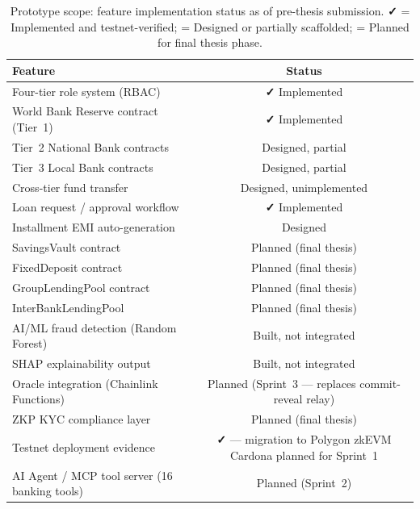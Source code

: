 \documentclass[12pt,a4paper]{report}
\newcommand{\tmarkDone}{\textbf{\faCheck}}
\newcommand{\tmarkPartial}{\faHourglassHalf}
\newcommand{\tmarkPlanned}{\textcolor{black!55}{\faCircle}}
\newcommand{\tableheadcolor}{\rowcolor{black!8}}
\newcommand{\tableheadfont}{\bfseries\small}
\begin{document}
\begin{table}[H]
\centering
\caption{Prototype scope: feature implementation status as of pre-thesis submission. \tmarkDone{} = Implemented and testnet-verified; \tmarkPartial{} = Designed or partially scaffolded; \tmarkPlanned{} = Planned for final thesis phase.}
\label{tab:prototype-scope}
\renewcommand{\arraystretch}{1.3}
\small
\begin{tabular}{@{}p{7.5cm}c@{}}
\toprule
\tableheadcolor
\tableheadfont Feature & \tableheadfont Status \\
\midrule
Four-tier role system (RBAC) & \tmarkDone{} Implemented \\
\rowcolor{RowShade}
World Bank Reserve contract (Tier~1) & \tmarkDone{} Implemented \\
Tier~2 National Bank contracts & \tmarkPartial{} Designed, partial \\
\rowcolor{RowShade}
Tier~3 Local Bank contracts & \tmarkPartial{} Designed, partial \\
Cross-tier fund transfer & \tmarkPartial{} Designed, unimplemented \\
\rowcolor{RowShade}
Loan request / approval workflow & \tmarkDone{} Implemented \\
Installment EMI auto-generation & \tmarkPartial{} Designed \\
\rowcolor{RowShade}
SavingsVault contract & \tmarkPlanned{} Planned (final thesis) \\
FixedDeposit contract & \tmarkPlanned{} Planned (final thesis) \\
\rowcolor{RowShade}
GroupLendingPool contract & \tmarkPlanned{} Planned (final thesis) \\
InterBankLendingPool & \tmarkPlanned{} Planned (final thesis) \\
\rowcolor{RowShade}
AI/ML fraud detection (Random Forest) & \tmarkPartial{} Built, not integrated \\
SHAP explainability output & \tmarkPartial{} Built, not integrated \\
\rowcolor{RowShade}
Oracle integration (Chainlink Functions) & \tmarkPlanned{} Planned (Sprint~3 --- replaces commit-reveal relay) \\
ZKP KYC compliance layer & \tmarkPlanned{} Planned (final thesis) \\
\rowcolor{RowShade}
Testnet deployment evidence & \tmarkDone{} --- migration to Polygon zkEVM Cardona planned for Sprint~1 \\
AI Agent / MCP tool server (16 banking tools) & \tmarkPlanned{} Planned (Sprint~2) \\

\end{tabular}
\end{table}
\end{document}
